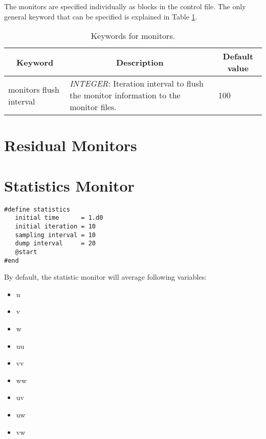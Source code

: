 \documentclass[a4paper,10pt]{report}
\begin{document}
The monitors are specified individually as blocks in the control file.
The only general keyword that can be specified is explained in Table \ref{tab:monitorsKey}.



\begin{table}[h]
\caption{Keywords for monitors.} \label{tab:monitorsKey}

\begin{tabular}{|p{4cm}|p{10cm}|p{2.2cm}|}
\hline
\multicolumn{1}{|c|}{\textbf{Keyword}} & \multicolumn{1}{c|}{\textbf{Description}} & \multicolumn{1}{c|}{\textbf{Default value}} \\ \hline

monitors flush interval 	&
			\textit{INTEGER}: Iteration interval to flush the monitor information to the monitor files. &
							100 \\ \hline

\end{tabular}
\end{table}

\section{Residual Monitors}

\section{Statistics Monitor}
\begin{lstlisting}
#define statistics
   initial time      = 1.d0
   initial iteration = 10
   sampling interval = 10
   dump interval     = 20
   @start
#end
\end{lstlisting}

By default, the statistic monitor will average following variables:

\begin{multicols}{3}
\begin{itemize}
\item u
\item v
\item w
\item uu
\item vv
\item ww
\item uv
\item uw
\item vw
\end{itemize}
\end{multicols}
\end{document}
